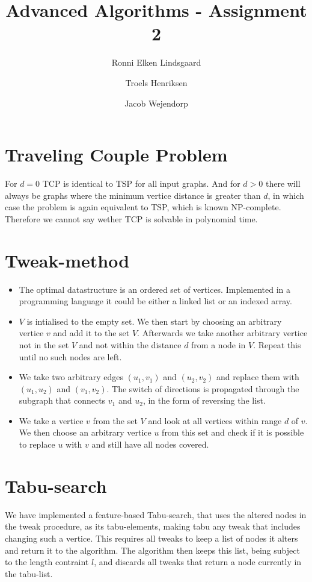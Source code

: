 \documentclass{article}
\title{Advanced Algorithms - Assignment 2}
\author{Ronni Elken Lindsgaard\and
Troels Henriksen\and
Jacob Wejendorp}
\begin{document}
\maketitle
\section{Traveling Couple Problem}
For $d=0$ TCP is identical to TSP for all input graphs. And for $d > 0$
there will always be graphs where the minimum vertice distance is
greater than $d$, in which case the problem is again equivalent to TSP, which
is known NP-complete. Therefore we cannot say wether TCP is solvable in
polynomial time.
\section{Tweak-method}
\begin{itemize}
\item The optimal datastructure is an ordered set of vertices.
Implemented in a programming language it could be either a linked list
or an indexed array.
\item $V$ is intialised to the empty set. We then start by choosing an arbitrary vertice $v$ and add it to the set $V$. 
Afterwards we take another arbitrary vertice not in the set $V$ and not
within the distance $d$ from a node in $V$. Repeat this until no such nodes are left.
\item We take two arbitrary edges $(u_1,v_1)$ and $(u_2,v_2)$ and
replace them with $(u_1,u_2)$ and $(v_1,v_2)$. The switch of directions
is propagated through the subgraph that connects $v_1$ and $u_2$, in the form of reversing the list.
\item We take a vertice $v$ from the set $V$ and look at all vertices within
range $d$ of $v$. We then choose an arbitrary vertice $u$ from this set
and check if it is possible to replace $u$ with $v$ and still have all
nodes covered.

\end{itemize}
\section{Tabu-search}
We have implemented a feature-based Tabu-search, that uses the altered nodes in the tweak procedure,
as its tabu-elements, making tabu any tweak that includes changing such a vertice.
This requires all tweaks to keep a list of nodes it alters and return it to the algorithm.
The algorithm then keeps this list, being subject to the length contraint $l$, and discards all tweaks that return
a node currently in the tabu-list.
\end{document}
